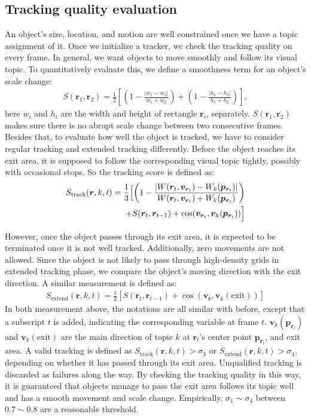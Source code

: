 \subsection{Tracking quality evaluation}
\label{sec:track_eval}
An object's size, location, and motion are well constrained once we have a topic assignment of it. 
Once we initialize a tracker, we check the tracking quality on every frame. In general, we want objects to move smoothly and follow its visual topic. To quantitatively evaluate this, we define a smoothness term for an object's scale change:
\begin{align}
    S(\bm{r}_1, \bm{r}_2) = \frac{1}{2}\left[\left(1-\frac{|w_1- w_2|}{w_1 + w_2}\right) + \left(1-\frac{|h_1 - h_2|}{h_1 + h_2}\right)\right], 
\end{align}
here $w_i$ and $h_i$ are the width and height of rectangle $\bm{r}_{i}$, separately. $S(\bm{r}_1, \bm{r}_2)$ makes sure there is no abrupt scale change between two consecutive frames.
Besides that, to evaluate how well the object is tracked, we have to consider regular tracking and extended tracking differently. 
Before the object reaches its exit area, it is supposed to follow the corresponding visual topic tightly, possibly with occasional stops. So the tracking score is defined as:
\begin{align}
\begin{split}
    S_{\text{track}}(\bm{r}, k, t) = \frac{1}{3}\Bigl[\left(1 - \frac{|W(\bm{r}_t, \bm{v}_{\bm{r}_t}) - W_k(\bm{p}_{\bm{r}_t})|}{W(\bm{r}_t, \bm{v}_{\bm{r}_t}) + W_k(\bm{p}_{\bm{r}_t})}\right) \\
    + S(\bm{r}_t, \bm{r}_{t-1}) + \cos(\bm{v}_{\bm{r}_t}, \bm{v}_k(\bm{p}_{\bm{r}_t}))\Bigl]
\end{split}
\label{eq:track_score}
\end{align}

However, once the object passes through its exit area, it is expected to be terminated once it is not well tracked. 
Additionally, zero movements are not allowed. Since the object is not likely to pass through high-density grids in extended tracking phase, we compare the object's moving direction with the exit direction. A similar measurement is defined as:
\begin{align}
    S_{\text{extend}}(\bm{r}, k, t) = \frac{1}{2}\left[S(\bm{r}_t, \bm{r}_{t-1}) + \cos(\bm{v_r}, \bm{v}_k(\text{exit}))\right]\label{eq:track_ext_score}
\end{align}
In both measurement above, the notations are all similar with before, except that a subscript $t$ is added, indicating the corresponding variable at frame $t$. 
$\bm{v}_k(\bm{p}_{\bm{r}_t})$ and $\bm{v}_k(\text{exit})$ are the main direction of topic $k$ at $\bm{r}_{t}$'s center point $\bm{p}_{\bm{r}_t}$, and exit area.
A valid tracking is defined as $S_{\text{track}}(\bm{r}, k, t)>\sigma_{3}$ or $S_{\text{extend}}(\bm{r}, k, t)>\sigma_{4}$, depending on whether it has passed through its exit area. 
Unqualified tracking is discarded as failures along the way.
By checking the tracking quality in this way, it is guaranteed that objects manage to pass the exit area follows its topic well and has a smooth movement and scale change. 
Empirically, $\sigma_1\sim\sigma_{4}$ between $0.7\sim0.8$ are a reasonable threshold.
